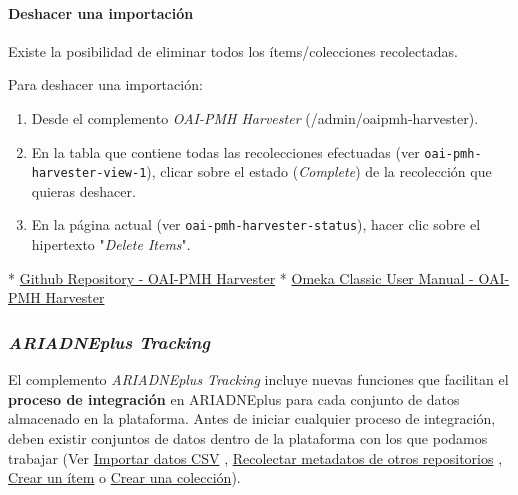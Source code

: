 \documentclass[
]{article}
\providecommand{\tightlist}{%
  \setlength{\itemsep}{0pt}\setlength{\parskip}{0pt}}
\begin{document}
\hypertarget{deshacer-una-importaciuxf3n}{%
\paragraph{Deshacer una importación}\label{deshacer-una-importaciuxf3n}}

Existe la posibilidad de eliminar todos los ítems/colecciones
recolectadas.

Para deshacer una importación:

\begin{enumerate}
\def\labelenumi{\arabic{enumi}.}
\tightlist
\item
  Desde el complemento \emph{OAI-PMH Harvester}
  ({/admin/oaipmh-harvester}).
\item
  En la tabla que contiene todas las recolecciones efectuadas (ver
  \texttt{oai-pmh-harvester-view-1}), clicar sobre el estado
  (\emph{Complete}) de la recolección que quieras deshacer.
\item
  En la página actual (ver \texttt{oai-pmh-harvester-status}), hacer
  clic sobre el hipertexto "\emph{Delete Items}".
\end{enumerate}

* \href{https://github.com/omeka/plugin-OaipmhHarvester}{Github
Repository - OAI-PMH Harvester} *
\href{https://github.com/omeka/plugin-OaipmhHarvester}{Omeka Classic
User Manual - OAI-PMH Harvester}

\hypertarget{ariadneplus-tracking}{%
\subsubsection{\texorpdfstring{\emph{ARIADNEplus
Tracking}}{ARIADNEplus Tracking}}\label{ariadneplus-tracking}}

El complemento \emph{ARIADNEplus Tracking} incluye nuevas funciones que
facilitan el \textbf{proceso de integración} en ARIADNEplus para cada
conjunto de datos almacenado en la plataforma. Antes de iniciar
cualquier proceso de integración, deben existir conjuntos de datos
dentro de la plataforma con los que podamos trabajar (Ver
\protect\hyperlink{importar-datos-csv}{Importar datos CSV} ,
\protect\hyperlink{recolectar-metadatos-de-otros-repositorios}{Recolectar
metadatos de otros repositorios} ,
\protect\hyperlink{crear-un-uxedtem}{Crear un ítem} o
\protect\hyperlink{crear-una-colecciuxf3n}{Crear una colección}).
\end{document}
